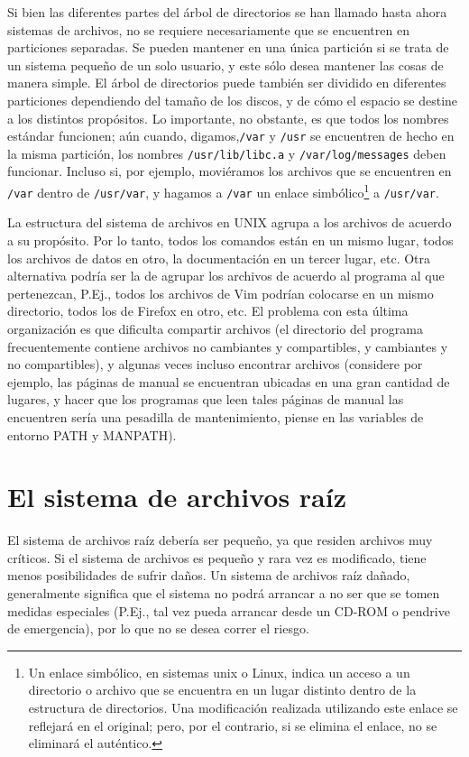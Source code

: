 \documentclass[12pt]{article}
\begin{document}
Si bien las diferentes partes del árbol de directorios se han
llamado hasta ahora sistemas de archivos, no se requiere necesariamente que se
encuentren en particiones separadas. Se pueden mantener en una única
partición si se trata de un sistema pequeño de un solo usuario, y este sólo
desea mantener las cosas de manera simple. El árbol de directorios puede también
ser dividido en  diferentes particiones dependiendo del tamaño de los discos, y
de cómo el espacio se destine a los distintos propósitos. Lo importante, no
obstante, es que todos los nombres estándar funcionen; aún cuando,
digamos,\texttt{/var} y \texttt{/usr} se encuentren de
hecho en la misma partición, los nombres \texttt{/usr/lib/libc.a} y
\texttt{/var/log/messages} deben funcionar. Incluso si, por ejemplo,
moviéramos los archivos que se encuentren en \texttt{/var} dentro de
\texttt{/usr/var}, y hagamos a \texttt{/var} un enlace
simbólico\footnote{Un enlace simbólico, en sistemas unix o Linux, indica 
un acceso a un directorio o archivo que se encuentra en un lugar distinto
dentro de la estructura de directorios. Una modificación realizada 
utilizando este enlace se reflejará en el original; pero, por el contrario, 
si se elimina el enlace, no se eliminará el auténtico.} a \texttt{/usr/var}.

 La estructura del sistema de archivos en UNIX agrupa a los archivos de
acuerdo a su propósito. Por lo tanto, todos los comandos están en un mismo
lugar, todos los archivos de datos en otro, la documentación en un tercer lugar,
etc.  Otra alternativa podría ser la de agrupar los archivos de acuerdo al
programa al que pertenezcan, P.Ej., todos los archivos de Vim podrían
colocarse en un mismo directorio, todos los de Firefox en otro, etc. El problema con
esta última organización es que dificulta compartir archivos (el directorio del
programa frecuentemente contiene archivos no cambiantes y compartibles, y
cambiantes y no compartibles), y algunas veces incluso encontrar archivos (considere 
por ejemplo, las páginas de manual se encuentran ubicadas en una gran cantidad de
lugares, y hacer que los programas que leen tales páginas de manual las
encuentren sería una pesadilla de mantenimiento, piense en las variables de entorno
PATH y MANPATH).  


\section{ El sistema de archivos raíz}

 El sistema de archivos raíz debería ser pequeño, ya que residen archivos
muy críticos. Si el sistema de archivos es pequeño y rara vez es modificado,
tiene menos posibilidades de sufrir daños. Un sistema de archivos raíz dañado,
generalmente significa que el sistema no podrá arrancar a no ser que se tomen
medidas especiales (P.Ej., tal vez pueda arrancar desde un CD-ROM o pendrive de
emergencia), por lo que no se desea correr el riesgo.  
\end{document}
